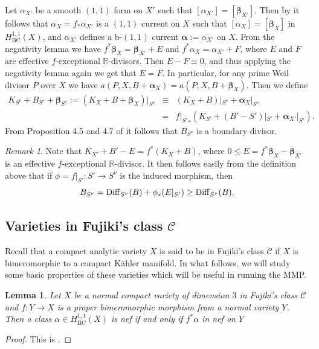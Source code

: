 \documentclass[12pt]{amsart}
\theoremstyle{plain}
\newtheorem{lemma}[theorem]{Lemma}
\theoremstyle{remark}
\newtheorem{remark}[theorem]{Remark}
\theoremstyle{definition}
\def\BC{\operatorname{BC}}
\newcommand{\<}{\leq}
\newcommand{\mbR}{\mathbb{R}}
\newcommand{\num}{\equiv}
\def\mcC{\mathcal{C}}
\def\bbeta{\boldsymbol{\beta}}
\theoremstyle{definition}
\theoremstyle{definition}
\numberwithin{equation}{section}
\theoremstyle{remark}
\begin{document}
Let $\alpha_{X'}$ be a smooth $(1,1)$ form on $X'$ such that $[\alpha_{X'}]=[\bbeta_{X'}]$. Then by \cite[Lemma 8.7]{DHP22} it follows that $\alpha_X=f_*\alpha_{X'}$ is a $(1,1)$ current on $X$ such that $[\alpha_X]=[\bbeta_X]$ in $H^{1,1}_{\BC}(X)$, and $\alpha_{X'}$ defines a b-$(1,1)$ current $\boldsymbol{\alpha}:=\overline{\alpha_{X'}}$ on $X$. From the negativity lemma we have $f^*\bbeta_X=\bbeta_{X'}+E$ and $f^*\alpha_X=\alpha_{X'}+F$, where $E$ and $F$ are effective $f$-exceptional $\mbR$-divisors. Then   $E-F\num 0$, and thus applying the negativity lemma again we get that $E=F$. In particular, for any prime Weil divisor $P$ over $X$ we have $a(P, X, B+\boldsymbol{\alpha}_X)=a(P, X, B+\bbeta_X)$.  Then we define 
\begin{eqnarray*}
    K_{S^\nu}+B_{S^\nu}+\bbeta_{S^\nu}:=(K_X+B+\bbeta_X)|_{S^\nu} &\num & (K_X+B)|_{S^\nu}+\boldsymbol{\alpha}_X|_{S^\nu}\\
                                                                &= &{f|_{S'}}_*(K_{S'}+(B'-S')|_{S'}+\boldsymbol{\alpha}_{X'}|_{S'}).
\end{eqnarray*}
From Proposition 4.5 and 4.7 of \cite{Kol13} it follows that $B_{S^\nu}$ is a boundary divisor.\\

\begin{remark}
 Note that $K_{X'}+B'-E=f^*(K_X+B)$, where $0\<E=f^*\bbeta _X-\bbeta _{X'}$ is an effective $f$-exceptional $\mbR$-divisor. It then follows easily from the definition above that if $\phi=f|_{S'} :S'\to S^\nu$ is the induced morphism, then 
 \[B_{S^\nu}={\rm Diff}_{S^\nu}(B)+\phi _*(E|_{S'})\geq {\rm Diff}_{S^\nu}(B).\]
\end{remark}



\subsection{Varieties in Fujiki's class $\mcC$} Recall that a compact analytic variety $X$ is said to be in Fujiki's class $\mcC$ if $X$ is bimeromorphic to a compact K\"ahler manifold. In what follows, we will study some basic properties of these varieties which will be useful in running the MMP.

\begin{lemma}\label{lem:pullback-nef}
Let $X$ be a normal compact variety of dimension $3$ in Fujiki's class $\mcC$ and $f:Y\to X$ is a proper bimeromorphic morphism from a normal variety $Y$. Then a class $\alpha\in H^{1,1}_{\BC}(X)$ is nef if and only if $f^*\alpha$ in nef on $Y$
\end{lemma}
\begin{proof}
    This is \cite[Lemma 3.13]{HP16}.
\end{proof}
\end{document}
